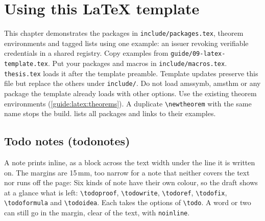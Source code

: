 \chapter{Using this \LaTeX{} template}\label{guide:latex}
This chapter demonstrates the packages in \texttt{include/packages.tex}, theorem environments and tagged lists using one example: an issuer revoking verifiable credentials in a shared registry.
Copy examples from \texttt{guide/09-latex-template.tex}.
Put your packages and macros in \texttt{include/macros.tex}. \texttt{thesis.tex} loads it after the template preamble. Template updates preserve this file but replace the others under \texttt{include/}.
Do not load amssymb, amsthm or any package the template already loads with other options. Use the existing theorem environments (\cref{guide:latex:theorems}). A duplicate \texttt{\textbackslash newtheorem} with the same name stops the build.
 lists all packages and links to their examples.

\section{Todo notes (todonotes)}\label{guide:latex:todo}
A note prints inline, as a block across the text width under the line it is written on. The margins are 15\,mm, too narrow for a note that neither covers the text nor runs off the page:
Six kinds of note have their own colour, so the draft shows at a glance what is left: \texttt{\textbackslash todoproof}, \texttt{\textbackslash todowrite}, \texttt{\textbackslash todoref}, \texttt{\textbackslash todofix}, \texttt{\textbackslash todoformula} and \texttt{\textbackslash todoidea}. Each takes the options of \texttt{\textbackslash todo}.
A word or two can still go in the margin, clear of the text, with \texttt{noinline}.

